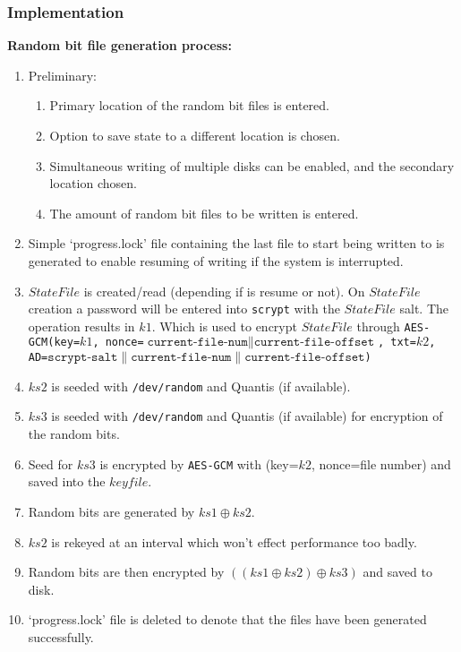 \documentclass{paper}
\begin{document}
				\subsubsection{Implementation}
					\textbf{Random bit file generation process:}
					\vspace{-0.75em}
					\begin{enumerate}
						\setlength\itemsep{-0.3em}
						\item Preliminary:
						\vspace{-0.75em}
						\begin{enumerate}
							\setlength\itemsep{-0.3em}
							\item Primary location of the random bit files is entered.
							\item Option to save state to a different location is chosen.
							\item Simultaneous writing of multiple disks can be enabled, and the secondary location chosen.
							\item The amount of random bit files to be written is entered.
						\end{enumerate}
	
						
						\item Simple `progress.lock' file containing the last file to start being written to is generated to enable resuming of writing if the system is interrupted.
						\item $\mathit{StateFile}$ is created/read (depending if is resume or not). On $\mathit{StateFile}$ creation a password will be entered into \texttt{scrypt} with the $\mathit{StateFile}$ salt. The operation results in $\mathit{k1}$. Which is used to encrypt $\mathit{StateFile}$ through \texttt{AES-GCM(key=$\mathit{k1}$, nonce=$\texttt{current-file-num}\parallel\texttt{current-file-offset}$, txt=$\mathit{k2}$,\\ AD=$ \texttt{scrypt-salt}\parallel\texttt{current-file-num}\parallel\texttt{current-file-offset}$)}
						\item $\mathit{ks2}$ is seeded with \texttt{/dev/random} and Quantis (if available).
						\item $\mathit{ks3}$ is seeded with \texttt{/dev/random} and Quantis (if available) for encryption of the random bits.
						\item Seed for $\mathit{ks3}$ is encrypted by \texttt{AES-GCM} with (key=$\mathit{k2}$, nonce=file number) and saved into the $\mathit{keyfile}$.
						\item Random bits are generated by $\mathit{ks1} \oplus \mathit{ks2}$.
						\item $\mathit{ks2}$ is rekeyed at an interval which won't effect performance too badly.
						\item Random bits are then encrypted by $((\mathit{ks1} \oplus \mathit{ks2}) \oplus\mathit{ks3})$ and saved to disk.
						\item `progress.lock' file is deleted to denote that the files have been generated successfully.
					\end{enumerate}
				
\end{document}
